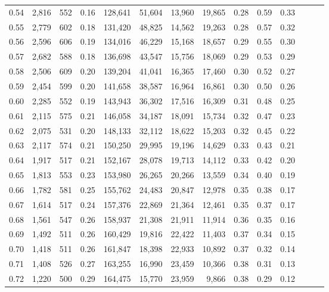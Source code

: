 \begin{tabular}{rrrrrrrrrrrrrr}
0.54 &  2,816 &    552 &  0.16 &  128,641 &   51,604 &  13,960 &  19,865 &  0.28 &  0.59 &      0.33 \\
0.55 &  2,779 &    602 &  0.18 &  131,420 &   48,825 &  14,562 &  19,263 &  0.28 &  0.57 &      0.32 \\
0.56 &  2,596 &    606 &  0.19 &  134,016 &   46,229 &  15,168 &  18,657 &  0.29 &  0.55 &      0.30 \\
0.57 &  2,682 &    588 &  0.18 &  136,698 &   43,547 &  15,756 &  18,069 &  0.29 &  0.53 &      0.29 \\
0.58 &  2,506 &    609 &  0.20 &  139,204 &   41,041 &  16,365 &  17,460 &  0.30 &  0.52 &      0.27 \\
0.59 &  2,454 &    599 &  0.20 &  141,658 &   38,587 &  16,964 &  16,861 &  0.30 &  0.50 &      0.26 \\
0.60 &  2,285 &    552 &  0.19 &  143,943 &   36,302 &  17,516 &  16,309 &  0.31 &  0.48 &      0.25 \\
0.61 &  2,115 &    575 &  0.21 &  146,058 &   34,187 &  18,091 &  15,734 &  0.32 &  0.47 &      0.23 \\
0.62 &  2,075 &    531 &  0.20 &  148,133 &   32,112 &  18,622 &  15,203 &  0.32 &  0.45 &      0.22 \\
0.63 &  2,117 &    574 &  0.21 &  150,250 &   29,995 &  19,196 &  14,629 &  0.33 &  0.43 &      0.21 \\
0.64 &  1,917 &    517 &  0.21 &  152,167 &   28,078 &  19,713 &  14,112 &  0.33 &  0.42 &      0.20 \\
0.65 &  1,813 &    553 &  0.23 &  153,980 &   26,265 &  20,266 &  13,559 &  0.34 &  0.40 &      0.19 \\
0.66 &  1,782 &    581 &  0.25 &  155,762 &   24,483 &  20,847 &  12,978 &  0.35 &  0.38 &      0.17 \\
0.67 &  1,614 &    517 &  0.24 &  157,376 &   22,869 &  21,364 &  12,461 &  0.35 &  0.37 &      0.17 \\
0.68 &  1,561 &    547 &  0.26 &  158,937 &   21,308 &  21,911 &  11,914 &  0.36 &  0.35 &      0.16 \\
0.69 &  1,492 &    511 &  0.26 &  160,429 &   19,816 &  22,422 &  11,403 &  0.37 &  0.34 &      0.15 \\
0.70 &  1,418 &    511 &  0.26 &  161,847 &   18,398 &  22,933 &  10,892 &  0.37 &  0.32 &      0.14 \\
0.71 &  1,408 &    526 &  0.27 &  163,255 &   16,990 &  23,459 &  10,366 &  0.38 &  0.31 &      0.13 \\
0.72 &  1,220 &    500 &  0.29 &  164,475 &   15,770 &  23,959 &   9,866 &  0.38 &  0.29 &      0.12 \\

\end{tabular}
